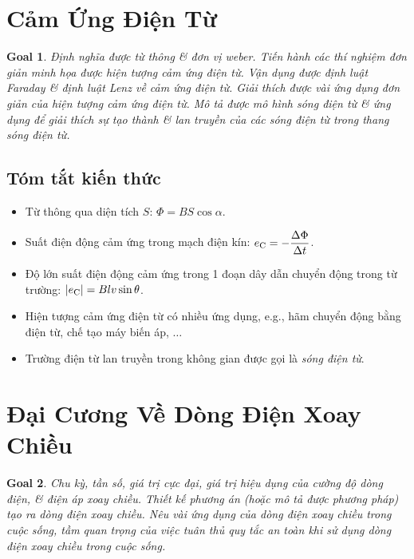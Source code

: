 \documentclass{article}
\newtheorem{goal}{Goal}
\begin{document}

\section{Cảm Ứng Điện Từ}

\begin{goal}
	Định nghĩa được từ thông \& đơn vị weber. Tiến hành các thí nghiệm đơn giản minh họa được hiện tượng cảm ứng điện từ. Vận dụng được định luật Faraday \& định luật Lenz về cảm ứng điện từ. Giải thích được vài ứng dụng đơn giản của hiện tượng cảm ứng điện từ. Mô tả được mô hình sóng điện từ \& ứng dụng để giải thích sự tạo thành \& lan truyền của các sóng điện từ trong thang sóng điện từ.
\end{goal}

\subsection{Tóm tắt kiến thức}

\begin{itemize}
	\item Từ thông qua diện tích $S$: $\Phi = BS\cos\alpha$.
	\item Suất điện động cảm ứng trong mạch điện kín: $e_{\rm C} = -\dfrac{\Delta\Phi}{\Delta t}$.
	\item Độ lớn suất điện động cảm ứng trong 1 đoạn dây dẫn chuyển động trong từ trường: $|e_{\rm C}| = Blv\sin\theta$.
	\item Hiện tượng cảm ứng điện từ có nhiều ứng dụng, e.g., hãm chuyển động bằng điện từ, chế tạo máy biến áp, $\ldots$
	\item Trường điện từ lan truyền trong không gian được gọi là {\it sóng điện từ}.
\end{itemize}


\section{Đại Cương Về Dòng Điện Xoay Chiều}

\begin{goal}
	Chu kỳ, tần số, giá trị cực đại, giá trị hiệu dụng của cường độ dòng điện, \& điện áp xoay chiều. Thiết kế phương án (hoặc mô tả được phương pháp) tạo ra dòng điện xoay chiều. Nêu vài ứng dụng của dòng điện xoay chiều trong cuộc sống, tầm quan trọng của việc tuân thủ quy tắc an toàn khi sử dụng dòng điện xoay chiều trong cuộc sống.
\end{goal}
\end{document}
